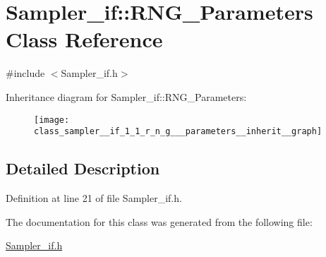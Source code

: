 \hypertarget{class_sampler__if_1_1_r_n_g___parameters}{\section{Sampler\-\_\-if\-:\-:R\-N\-G\-\_\-\-Parameters Class Reference}
\label{class_sampler__if_1_1_r_n_g___parameters}
}


{\ttfamily \#include $<$Sampler\-\_\-if.\-h$>$}



Inheritance diagram for Sampler\-\_\-if\-:\-:R\-N\-G\-\_\-\-Parameters\-:\nopagebreak
\begin{figure}[H]
\begin{center}
\leavevmode
\texttt{[image: class\_sampler\_\_if\_1\_1\_r\_n\_g\_\_\_parameters\_\_inherit\_\_graph]}
\end{center}
\end{figure}


\subsection{Detailed Description}


Definition at line 21 of file Sampler\-\_\-if.\-h.



The documentation for this class was generated from the following file\-:\begin{DoxyCompactItemize}
\item 
\hyperlink{_sampler__if_8h}{Sampler\-\_\-if.\-h}\end{DoxyCompactItemize}
